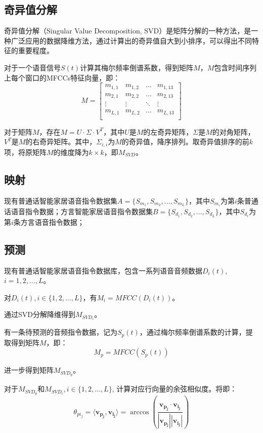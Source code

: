 \documentclass[lang=cn,cite=super]{elegantpaper}
\begin{document}
\subsection{奇异值分解}
奇异值分解（Singular Value Decomposition, SVD）是矩阵分解的一种方法，是一种广泛应用的数据降维方法，通过计算出的奇异值自大到小排序，可以得出不同特征的重要程度。

对于一个语音信号$S(t)$计算其梅尔频率倒谱系数，得到矩阵$M$，$M$包含时间序列上每个窗口的MFCCs特征向量，即：
\begin{equation}
    M = 
    \begin{bmatrix}
        m_{1,1} & m_{1,2} & \ldots & m_{1,13} \\
        m_{2,1} & m_{2,2} & \ldots & m_{2,13} \\
        \vdots & \vdots & \ddots & \vdots \\
        m_{L,1} & m_{L,2} & \ldots & m_{L,13}\\
    \end{bmatrix}
\end{equation}

对于矩阵$M$，存在$M = U \cdot \Sigma \cdot V^T$，其中$U$是$M$的左奇异矩阵，$\Sigma$是$M$的对角矩阵，$V^T$是$M$的右奇异矩阵。其中，$\Sigma_{i,i}$为$M$的奇异值，降序排列。取奇异值排序的前$k$项，将原矩阵$M$的维度降为$k \times k$，即$M_{SVD}$。
\subsection{映射}
现有普通话智能家居语音指令数据集$A=\{S_{m_1}, S_{m_2}, \ldots, S_{m_L}\}$，其中$S_{m_i}$为第$i$条普通话语音指令数据；方言智能家居语音指令数据集$B=\{S_{d_1}, S_{d_2}, \ldots, S_{d_L}\}$，其中$S_{d_i}$为第$i$条方言语音指令数据；
\subsection{预测}
现有普通话智能家居语音指令数据库，包含一系列语音音频数据$D_i(t)$, $i = 1, 2, \ldots, L$。

对$D_i(t), i\in \{1,2,\ldots, L\}$，有$M_i = MFCC(D_i(t))$。

通过SVD分解降维得到$M_{SVD_i}$。

有一条待预测的音频指令数据，记为$S_p(t)$，通过梅尔频率倒谱系数的计算，提取得到矩阵$M$，即：
\begin{equation}
    M_p = MFCC(S_p(t))
\end{equation}

进一步得到矩阵$M_{SVD_p}$。

对于$M_{SVD_p}$和$M_{SVD_i}, i \in \{ 1,2,\ldots, L\}$, 计算对应行向量的余弦相似度。将即：
\begin{equation}
    \theta_{pi_{j}} = \langle \bm{v_{p_j}},\bm{v_{i_j}} \rangle = \arccos \left( \frac{\bm{v_{p_j}} \cdot \bm{v_{i_j}}}{|\bm{v_{p_j}}||\bm{v_{i_j}}|} \right)
\end{equation}
\end{document}
